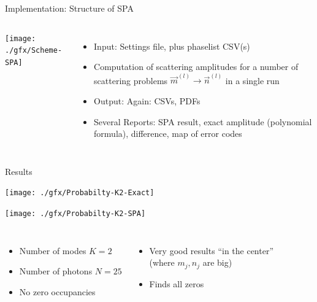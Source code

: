 \begin{frame}{Implementation: Structure of SPA}
%
\vspace{-15pt}
\begin{columns}[t]
\begin{center}
	\texttt{[image: ./gfx/Scheme-SPA]}
\end{center}
%
\begin{itemize}
\item Input: Settings file, plus phaselist CSV(s)
\item Computation of scattering amplitudes for a number of scattering problems $\vec{m}^{(l)} \to \vec{n}^{(l)}$ in a single run
\item Output: Again: CSVs, PDFs
\item Several Reports: SPA result, exact amplitude (polynomial formula), difference, map of error codes
\end{itemize}
\end{columns}
%
\end{frame}


\begin{frame}{Results}
%
\begin{minipage}{.49\linewidth}
	\texttt{[image: ./gfx/Probabilty-K2-Exact]}
\end{minipage}
%
\begin{minipage}{.49\linewidth}
	\texttt{[image: ./gfx/Probabilty-K2-SPA]}
\end{minipage}
%
\begin{columns}[t]
\begin{itemize}
\item Number of modes $K = 2$
\item Number of photons $N = 25$
\item No zero occupancies
\end{itemize}
%
\begin{itemize}
\item Very good results \enquote{in the center}\\
	(where $m_j, n_j$ are big)
\item Finds all zeros
\end{itemize}
\end{columns}
%
\end{frame}


